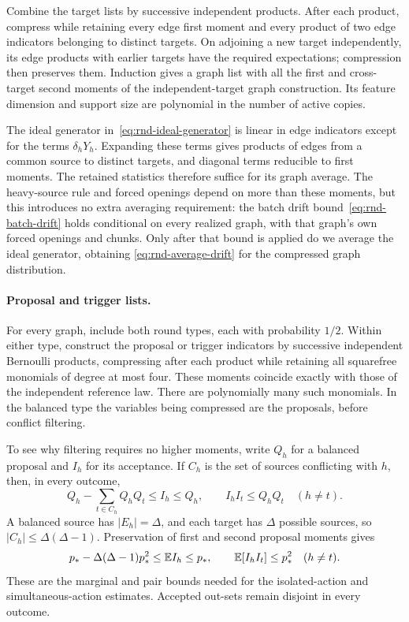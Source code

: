 Combine the target lists by successive independent products. After
each product, compress while retaining every edge first moment and
every product of two edge indicators belonging to distinct targets.
On adjoining a new target independently, its edge products with earlier
targets have the required expectations; compression then preserves
them. Induction gives a graph list with all the first and cross-target
second moments of the independent-target graph construction. Its
feature dimension and support size are polynomial in the number of
active copies.

The ideal generator in~\eqref{eq:rnd-ideal-generator} is linear in
edge indicators except for the terms \(\delta_hY_h\). Expanding these
terms gives products of edges from a common source to distinct targets,
and diagonal terms reducible to first moments. The retained statistics
therefore suffice for its graph average. The heavy-source rule and
forced openings depend on more than these moments, but this introduces
no extra averaging requirement: the batch drift
bound~\eqref{eq:rnd-batch-drift} holds conditional on every realized
graph, with that graph's own forced openings and chunks. Only after
that bound is applied do we average the ideal generator, obtaining
\eqref{eq:rnd-average-drift} for the compressed graph distribution.

\paragraph{Proposal and trigger lists.}
For every graph, include both round types, each with probability
\(1/2\). Within either type, construct the proposal or trigger
indicators by successive independent Bernoulli products, compressing
after each product while retaining all squarefree monomials of degree
at most four. These moments coincide exactly with those of the
independent reference law. There are polynomially many such
monomials. In the balanced type the variables being compressed are
the proposals, before conflict filtering.

To see why filtering requires no higher moments, write \(Q_h\) for a
balanced proposal and \(I_h\) for its acceptance. If \(C_h\) is the
set of sources conflicting with \(h\), then, in every outcome,
\[
 Q_h-\sum_{t\in C_h}Q_hQ_t\le I_h\le Q_h,
 \qquad
 I_hI_t\le Q_hQ_t\quad(h\ne t).
\]
A balanced source has \(|E_h|=\Delta\), and each target has
\(\Delta\) possible sources, so \(|C_h|\le\Delta(\Delta-1)\).
Preservation of first and second proposal moments gives
\begin{equation}
 p_*-\Delta(\Delta-1)p_*^2\le\mathbb E I_h\le p_*,
 \qquad
 \mathbb E[I_hI_t]\le p_*^2\quad(h\ne t).
 \label{eq:list-conflict-moments}
\end{equation}
These are the marginal and pair bounds needed for the isolated-action
and simultaneous-action estimates. Accepted out-sets remain disjoint
in every outcome.

